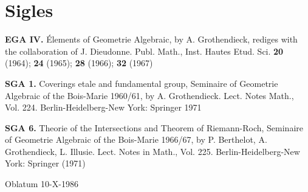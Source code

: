 \documentclass[12pt,a4paper]{article}
\theoremstyle{plain}
\theoremstyle{definition}
\theoremstyle{remark}
\begin{document}
\section*{Sigles}

\textbf{EGA IV.} \'Elements of Geometrie Algebraic, by A. Grothendieck, rediges with the collaboration of J. Dieudonne. Publ. Math., Inst. Hautes Etud. Sci. \textbf{20} (1964); \textbf{24} (1965); \textbf{28} (1966); \textbf{32} (1967)

\textbf{SGA 1.} Coverings etale and fundamental group, Seminaire of Geometrie Algebraic of the Bois-Marie 1960/61, by A. Grothendieck. Lect. Notes Math., Vol. 224. Berlin-Heidelberg-New York: Springer 1971

\textbf{SGA 6.} Theorie of the Intersections and Theorem of Riemann-Roch, Seminaire of Geometrie Algebraic of the Bois-Marie 1966/67, by P. Berthelot, A. Grothendieck, L. Illusie. Lect. Notes in Math., Vol. 225. Berlin-Heidelberg-New York: Springer (1971)

\vspace{1cm}
\begin{center}
Oblatum 10-X-1986
\end{center}
\end{document}
